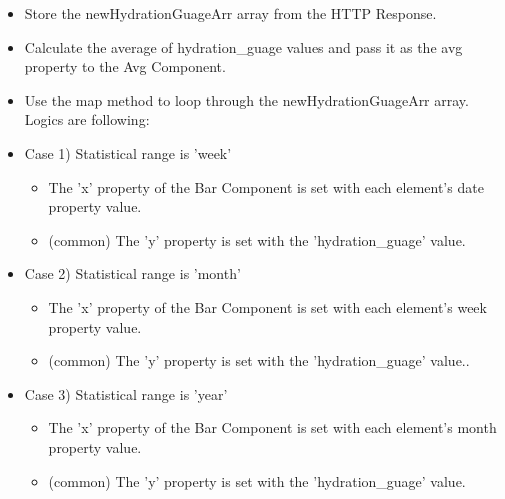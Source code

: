 \documentclass[conference]{IEEEtran}
\begin{document}
\begin{itemize}
    \begin{itemize}
        \item Store the newHydrationGuageArr array from the HTTP Response.
        \item Calculate the average of hydration\_guage values and pass it as the avg property to the Avg Component.
        \item Use the map method to loop through the newHydrationGuageArr array. Logics are following:
        \item Case 1) Statistical range is 'week' 
        \begin{itemize}
            \item The 'x' property of the Bar Component is set with each element's date property value.
            \item (common) The 'y' property is set with the 'hydration\_guage' value.
        \end{itemize}
        \item Case 2) Statistical range is 'month' 
        \begin{itemize}
            \item The 'x' property of the Bar Component is set with each element's week property value.
            \item (common) The 'y' property is set with the 'hydration\_guage' value..
        \end{itemize}
        \item Case 3) Statistical range is 'year' 
        \begin{itemize}
            \item The 'x' property of the Bar Component is set with each element's month property value.
            \item (common) The 'y' property is set with the 'hydration\_guage' value.
            \\
        \end{itemize}
    \end{itemize}
\end{itemize}
\end{document}
